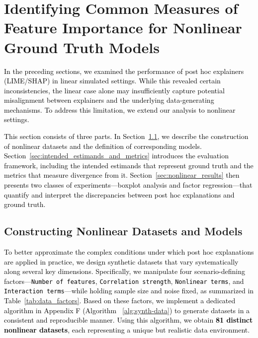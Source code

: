 \documentclass[mnsc,blindrev]{informs3}
\begin{document}
\section{Identifying Common Measures of Feature Importance for Nonlinear Ground Truth Models}
\label{sec:general_case}

\textcolor{black}{In the preceding sections, we examined the performance of post hoc explainers (LIME/SHAP) in linear simulated settings. While this revealed certain inconsistencies, the linear case alone may insufficiently capture potential misalignment between explainers and the underlying data-generating mechanisms. To address this limitation, we extend our analysis to nonlinear settings.}

\textcolor{black}{This section consists of three parts. In Section~\ref{sec:nonlinear_data_generation}, we describe the construction of nonlinear datasets and the definition of corresponding models. Section~\ref{sec:intended_estimands_and_metrics} introduces the evaluation framework, including the intended estimands that represent ground truth and the metrics that measure divergence from it. Section~\ref{sec:nonlinear_results} then presents two classes of experiments—boxplot analysis and factor regression—that quantify and interpret the discrepancies between post hoc explanations and ground truth.}

\subsection{Constructing Nonlinear Datasets and Models}
\label{sec:nonlinear_data_generation}

\textcolor{black}{To better approximate the complex conditions under which post hoc explanations are applied in practice, we design synthetic datasets that vary systematically along several key dimensions. Specifically, we manipulate four scenario-defining factors—\texttt{Number of features}, \texttt{Correlation strength}, \texttt{Nonlinear terms}, and \texttt{Interaction terms}—while holding sample size and noise fixed, as summarized in Table~\ref{tab:data_factors}. Based on these factors, we implement a dedicated algorithm in Appendix F (Algorithm ~\ref{alg:synth-data}) to generate datasets in a consistent and reproducible manner. Using this algorithm, we obtain \textbf{81 distinct nonlinear datasets}, each representing a unique but realistic data environment.}
\end{document}
